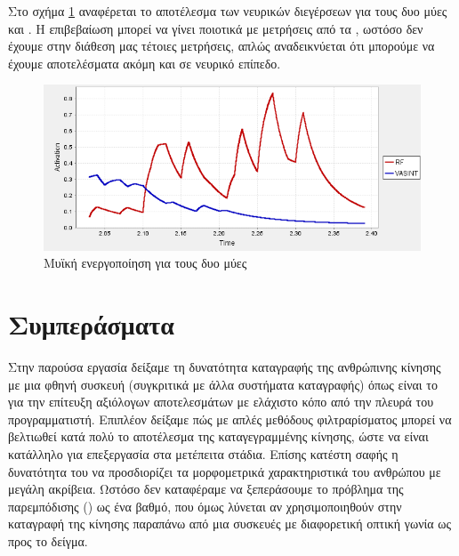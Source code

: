 Στο σχήμα \ref{fig:rf-vasint-activation} αναφέρεται το αποτέλεσμα των νευρικών διεγέρσεων για τους δυο μύες  και . Η επιβεβαίωση μπορεί να γίνει ποιοτικά με μετρήσεις από τα , ωστόσο δεν έχουμε στην διάθεση μας τέτοιες μετρήσεις, απλώς αναδεικνύεται ότι μπορούμε να έχουμε αποτελέσματα ακόμη και σε νευρικό επίπεδο.

\begin{figure}[H]
    \centering
    \includegraphics[width=0.8\linewidth, keepaspectratio]{fig/rf-vasint-activation.png}
    \caption{Μυϊκή ενεργοποίηση για τους δυο μύες}
    \label{fig:rf-vasint-activation}
\end{figure}


\section{Συμπεράσματα}

Στην παρούσα εργασία δείξαμε τη δυνατότητα καταγραφής της ανθρώπινης κίνησης με μια φθηνή συσκευή (συγκριτικά με άλλα συστήματα καταγραφής) όπως είναι το  για την επίτευξη αξιόλογων αποτελεσμάτων με ελάχιστο κόπο από την πλευρά του προγραμματιστή. Επιπλέον δείξαμε πώς με απλές μεθόδους φιλτραρίσματος μπορεί να βελτιωθεί κατά πολύ το αποτέλεσμα της καταγεγραμμένης κίνησης, ώστε να είναι κατάλληλο για επεξεργασία στα μετέπειτα στάδια. Επίσης κατέστη σαφής η δυνατότητα του  να προσδιορίζει τα μορφομετρικά χαρακτηριστικά του ανθρώπου με μεγάλη ακρίβεια. Ωστόσο δεν καταφέραμε να ξεπεράσουμε το πρόβλημα της παρεμπόδισης () ως ένα βαθμό, που όμως λύνεται αν χρησιμοποιηθούν στην καταγραφή της κίνησης παραπάνω από μια συσκευές με διαφορετική οπτική γωνία ως προς το δείγμα.

